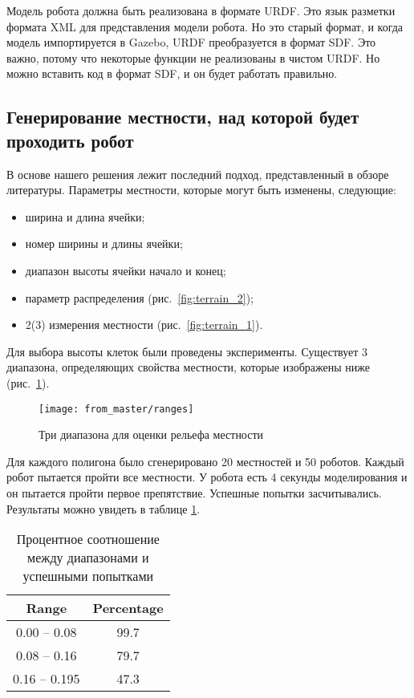 Модель робота должна быть реализована в формате URDF. Это язык разметки формата XML для представления модели робота. Но это старый формат, и когда модель импортируется в Gazebo, URDF преобразуется в формат SDF. Это важно, потому что некоторые функции не реализованы в чистом URDF. Но можно вставить код в формат SDF, и он будет работать правильно.

\subsection{Генерирование местности, над которой будет проходить робот}
В основе нашего решения лежит последний подход, представленный в обзоре литературы.
Параметры местности, которые могут быть изменены, следующие:
\begin{itemize}
\item ширина и длина ячейки;
\item номер ширины и длины ячейки;
\item диапазон высоты ячейки начало и конец;
\item параметр распределения (рис.~\ref{fig:terrain_2});
\item 2(3) измерения местности (рис.~\ref{fig:terrain_1}).
\end{itemize}

Для выбора высоты клеток были проведены эксперименты.
Существует 3 диапазона, определяющих свойства местности, которые изображены ниже (рис.~\ref{fig:range}).

\begin{figure}[H]
\centering\texttt{[image: from\_master/ranges]}\\
\caption{Три диапазона для оценки рельефа местности}
\label{fig:range}
\end{figure}

Для каждого полигона было сгенерировано 20 местностей и 50 роботов. Каждый робот пытается пройти все местности. У робота есть 4 секунды моделирования и он пытается пройти первое препятствие. Успешные попытки засчитывались. Результаты можно увидеть в таблице \ref{tabular:ranges}.

\begin{table}[H]
\caption{Процентное соотношение между диапазонами и успешными попытками}
\label{tabular:ranges}
\begin{center}
\begin{tabular}{c|c}
 \textbf{Range} & \textbf{Percentage}\\
 \hline
0.00 -- 0.08 & 99.7 \\ 
0.08 -- 0.16 & 79.7 \\
0.16 -- 0.195 & 47.3 \\
\end{tabular}
\end{center}
\end{table}


